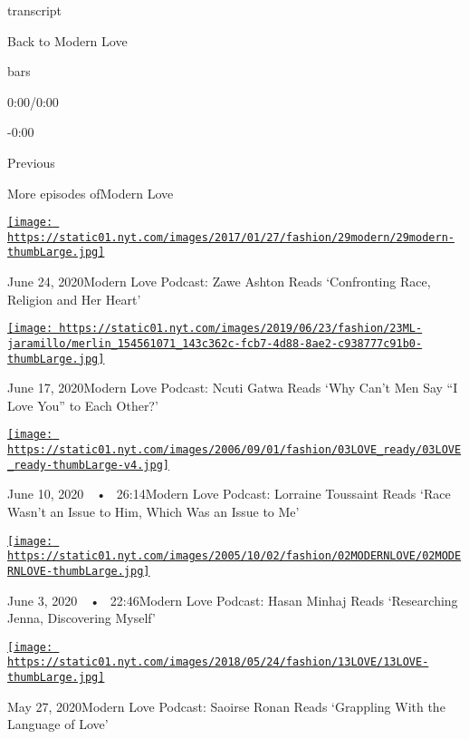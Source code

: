 transcript

Back to Modern Love

bars

0:00/0:00

-0:00

Previous

More episodes ofModern Love

\href{https://www.nytimes.com/2020/06/24/style/modern-love-podcast-zawe-ashton.html?action=click\&module=audio-series-bar\&region=header\&pgtype=Article}{\texttt{[image: https://static01.nyt.com/images/2017/01/27/fashion/29modern/29modern-thumbLarge.jpg]}}

June 24, 2020Modern Love Podcast: Zawe Ashton Reads `Confronting Race,
Religion and Her Heart'

\href{https://www.nytimes.com/2020/06/17/style/modern-love-podcast-ncuti-gatwa.html?action=click\&module=audio-series-bar\&region=header\&pgtype=Article}{\texttt{[image: https://static01.nyt.com/images/2019/06/23/fashion/23ML-jaramillo/merlin\_154561071\_143c362c-fcb7-4d88-8ae2-c938777c91b0-thumbLarge.jpg]}}

June 17, 2020Modern Love Podcast: Ncuti Gatwa Reads `Why Can't Men Say
``I Love You'' to Each Other?'

\href{https://www.nytimes.com/2020/06/10/style/modern-love-podcast-lorraine-toussant-updated-poscript.html?action=click\&module=audio-series-bar\&region=header\&pgtype=Article}{\texttt{[image: https://static01.nyt.com/images/2006/09/01/fashion/03LOVE\_ready/03LOVE\_ready-thumbLarge-v4.jpg]}}

June 10, 2020~~•~ 26:14Modern Love Podcast: Lorraine Toussaint Reads
`Race Wasn't an Issue to Him, Which Was an Issue to Me'

\href{https://www.nytimes.com/2020/06/03/style/modern-love-podcast-hasan-minhaj.html?action=click\&module=audio-series-bar\&region=header\&pgtype=Article}{\texttt{[image: https://static01.nyt.com/images/2005/10/02/fashion/02MODERNLOVE/02MODERNLOVE-thumbLarge.jpg]}}

June 3, 2020~~•~ 22:46Modern Love Podcast: Hasan Minhaj Reads
`Researching Jenna, Discovering Myself'

\href{https://www.nytimes.com/2020/05/27/style/modern-love-podcast-saoirse-ronan.html?action=click\&module=audio-series-bar\&region=header\&pgtype=Article}{\texttt{[image: https://static01.nyt.com/images/2018/05/24/fashion/13LOVE/13LOVE-thumbLarge.jpg]}}

May 27, 2020Modern Love Podcast: Saoirse Ronan Reads `Grappling With the
Language of Love'

